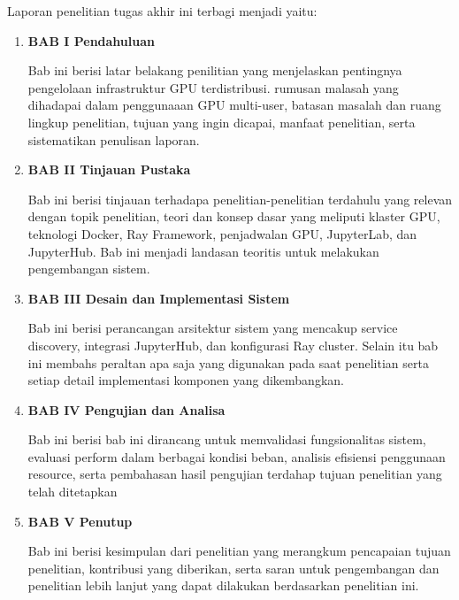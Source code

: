 Laporan penelitian tugas akhir ini terbagi menjadi \lipsum[1][1-3] yaitu:

\begin{enumerate}[nolistsep]

  \item \textbf{BAB I Pendahuluan}

        Bab ini berisi latar belakang penilitian yang menjelaskan pentingnya pengelolaan infrastruktur GPU terdistribusi. rumusan malasah yang dihadapai dalam penggunaaan GPU multi-user, batasan masalah dan ruang lingkup penelitian, tujuan yang ingin dicapai, manfaat penelitian, serta sistematikan penulisan laporan.

        \vspace{2ex}

  \item \textbf{BAB II Tinjauan Pustaka}

        Bab ini berisi tinjauan terhadapa penelitian-penelitian terdahulu yang relevan dengan topik penelitian, teori dan konsep dasar yang meliputi klaster GPU, teknologi Docker, Ray Framework, penjadwalan GPU, JupyterLab, dan JupyterHub. Bab ini menjadi landasan teoritis untuk melakukan pengembangan sistem.

        \vspace{2ex}

  \item \textbf{BAB III Desain dan Implementasi Sistem}

        Bab ini berisi perancangan arsitektur sistem yang mencakup service discovery, integrasi JupyterHub, dan konfigurasi Ray cluster. Selain itu bab ini membahs peraltan apa saja yang digunakan pada saat penelitian serta setiap detail implementasi komponen yang dikembangkan.

        \vspace{2ex}

  \item \textbf{BAB IV Pengujian dan Analisa}

        Bab ini berisi bab ini dirancang untuk memvalidasi fungsionalitas sistem, evaluasi perform dalam berbagai kondisi beban, analisis efisiensi penggunaan resource, serta pembahasan hasil pengujian terdahap tujuan penelitian yang telah ditetapkan

        \vspace{2ex}

  \item \textbf{BAB V Penutup}

        Bab ini berisi kesimpulan dari penelitian yang merangkum pencapaian tujuan penelitian, kontribusi yang diberikan, serta saran untuk pengembangan dan penelitian lebih lanjut yang dapat dilakukan berdasarkan penelitian ini.

\end{enumerate}